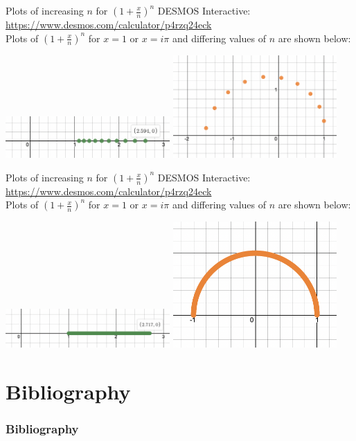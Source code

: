 \documentclass{beamer}
\begin{document}
\begin{frame}
  \begin{block}{Plots of increasing $n$ for $(1 + \frac{x}{n})^n$}
  DESMOS Interactive: \url{https://www.desmos.com/calculator/p4rzq24eck}\\
  Plots of $(1+\frac{x}{n})^n$ for $x = 1$ or $x=i\pi$ and differing values of $n$ are shown below:
  \end{block}
  \begin{minipage}{\textwidth}
    \includegraphics[width=0.47\textwidth]{real_exp_10.png}
    \includegraphics[width=0.47\textwidth]{complex_exp_10.png}
  \end{minipage}
\end{frame}

\begin{frame}
  \begin{block}{Plots of increasing $n$ for $(1 + \frac{x}{n})^n$}
  DESMOS Interactive: \url{https://www.desmos.com/calculator/p4rzq24eck}\\
  Plots of $(1+\frac{x}{n})^n$ for $x = 1$ or $x=i\pi$ and differing values of $n$ are shown below:
  \end{block}
  \begin{minipage}{\textwidth}
    \includegraphics[width=0.47\textwidth]{real_exp_1000.png}
    \includegraphics[width=0.47\textwidth]{complex_exp_1000.png}
  \end{minipage}
\end{frame}

\section{Bibliography}
\begin{frame}
  \frametitle{Bibliography}
  \printbibliography
\end{frame}


\end{document}
